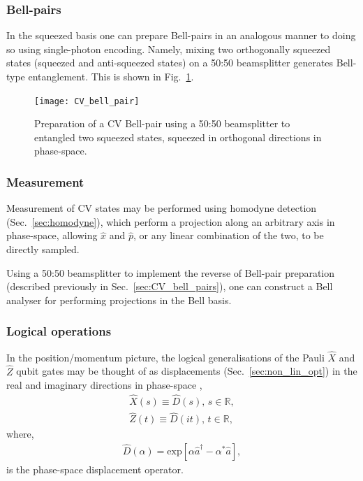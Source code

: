 %
%

\subsubsection{Bell-pairs}\label{sec:CV_bell_pairs}

In the squeezed basis one can prepare Bell-pairs in an analogous manner to doing so using single-photon encoding. Namely, mixing two orthogonally squeezed states (squeezed and anti-squeezed states) on a 50:50 beamsplitter generates Bell-type entanglement. This is shown in Fig.~\ref{fig:CV_bell_pair}.

\begin{figure}[!htb]
\texttt{[image: CV\_bell\_pair]}
\caption{Preparation of a CV Bell-pair using a 50:50 beamsplitter to entangled two  squeezed states, squeezed in orthogonal directions in phase-space.}\label{fig:CV_bell_pair}	
\end{figure}


%
%

\subsubsection{Measurement}

Measurement of CV states may be performed using homodyne detection (Sec.~\ref{sec:homodyne}), which perform a projection along an arbitrary axis in phase-space, allowing $\hat{x}$ and $\hat{p}$, or any linear combination of the two, to be directly sampled.

Using a 50:50 beamsplitter to implement the reverse of Bell-pair preparation (described previously in Sec.~\ref{sec:CV_bell_pairs}), one can construct a Bell analyser for performing projections in the Bell basis.



%
%

\subsubsection{Logical operations}

In the position/momentum picture, the logical generalisations of the Pauli $\hat{X}$ and $\hat{Z}$ qubit gates may be thought of as displacements (Sec.~\ref{sec:non_lin_opt}) in the real and imaginary directions in phase-space \cite{bib:KokLovettBook},
\begin{align}
\hat{X}(s) \equiv \hat{D}(s)	, \, s\in\mathbb{R},\nonumber\\
\hat{Z}(t) \equiv \hat{D}(it), \, t\in\mathbb{R},
\end{align}
where,
\begin{align}\label{eq:disp_op}
\hat{D}(\alpha) = \text{exp}\left[\alpha\hat{a}^\dag - \alpha^*\hat{a}\right],
\end{align}
is the phase-space displacement operator.

